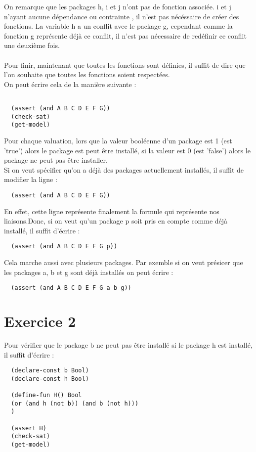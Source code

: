 \documentclass{article}
\begin{document}
On remarque que les packages h, i et j n'ont pas de fonction associée. i et j n'ayant aucune dépendance ou
contrainte , il n'est pas nécéssaire de créer des fonctions. La variable h a un conflit avec le package g,
cependant comme la fonction g représente déjà ce conflit, il n'est pas nécessaire de redéfinir ce conflit
une deuxième fois.\\
\\
Pour finir, maintenant que toutes les fonctions sont définies, il suffit de dire que l'on souhaite que toutes
les fonctions soient respectées.\\
On peut écrire cela de la manière suivante :
\begin{lstlisting}

  (assert (and A B C D E F G))
  (check-sat)
  (get-model)

\end{lstlisting}
Pour chaque valuation, lors que la valeur booléenne d'un package est 1 (est 'true') alors le package est peut être
installé, si la valeur est 0 (est 'false') alors le package ne peut pas être installer.\\Si on veut spécifier
qu'on a déjà des packages actuellement installés, il suffit de modifier la ligne :

\begin{lstlisting}
  (assert (and A B C D E F G))
\end{lstlisting}

En effet, cette ligne représente finalement la formule qui représente nos liaisons.Donc, si on veut qu'un package
p soit pris en compte comme déjà installé, il suffit d'écrire :

\begin{lstlisting}
  (assert (and A B C D E F G p))
\end{lstlisting}

Cela marche aussi avec plusieurs packages. Par exemble si on veut présicer que les packages a, b et g sont déjà installés on peut écrire :
\begin{lstlisting}
  (assert (and A B C D E F G a b g))
\end{lstlisting}

\section*{Exercice 2}
Pour vérifier que le package b ne peut pas être installé si le package h est installé, il suffit d'écrire :
\begin{lstlisting}
  (declare-const b Bool)
  (declare-const h Bool)

  (define-fun H() Bool
  (or (and h (not b)) (and b (not h)))
  )

  (assert H)
  (check-sat)
  (get-model)

\end{lstlisting}
\end{document}
